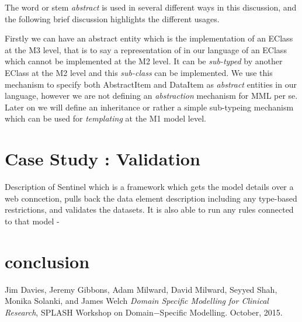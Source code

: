 \documentclass[conference]{IEEEtran}
\begin{document}
The word or stem \emph{abstract} is used in several different ways in this discussion, and the following brief discussion highlights the different usages.  

Firstly we can have an abstract entity which is the implementation of an EClass at the M3 level, that is to say a representation of in our language of an EClass which cannot be implemented at the M2 level. It can be \emph{sub-typed} by another EClass at the M2 level and this \emph{sub-class} can be implemented. We use this mechanism to specify both AbstractItem and DataItem as \emph{abstract} entities in our language, however we are not defining an \emph{abstraction} mechanism for MML per se. Later on we will define an inheritance or rather a simple sub-typeing mechanism which can be used for \emph{templating} at the M1 model level. 

\section{Case Study : Validation}


Description of Sentinel which is a framework which gets the model details over a web conncetion, pulls back the data element description including any type-based restrictions, and validates the datasets.
It is also able to run any rules connected to that model - 


\section{conclusion}

 


\begin{thebibliography}{1}

Jim Davies, Jeremy Gibbons, Adam Milward, David Milward,
Seyyed Shah, Monika Solanki, and James Welch \emph{Domain Specific Modelling for Clinical Research},  \relax SPLASH Workshop on Domain−Specific Modelling. October, 2015.
  

\end{thebibliography}




\end{document}
